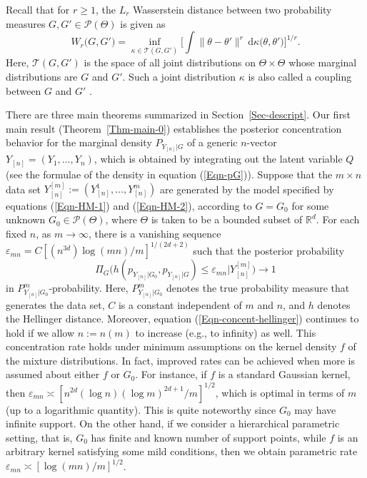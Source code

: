 \documentclass[MSNbibl,number,citesort]{arxbj}
\newcommand{\eqref}[1]{(\ref{#1})}
\newcommand{\real}{\mathbb{R}}
\newcommand{\Pcal}{\mathscr{P}}
\newcommand{\TPlan}{\mathcal{T}}
\newcommand{\Wr}{W_r}
\newcommand{\coupling}{\kappa}
\newcommand{\PGz}{P_{Y_{[n]}|G_0}}
\newcommand{\PG}{P_{Y_{[n]}|G}}
\newcommand{\YYn}{Y_{[n]}}
\newcommand{\epsmn}{\varepsilon_{mn}}
\begin{document}
Recall that for $r\geq1$, the $L_r$ Wasserstein distance between
two probability measures $G,G'\in\Pcal(\Theta)$ is given as
%
%
\begin{equation}
\label{Eqn-W-def} \Wr \bigl(G,G' \bigr) = \inf_{\coupling\in\TPlan(G,G')}
\biggl[\int\bigl\|\theta- \theta'\bigr\|^r \,\mathrm{d}\coupling
\bigl(\theta, \theta' \bigr) \biggr]^{1/r}.
\end{equation}
%
Here, $\TPlan(G,G')$ is the space of all joint distributions
on $\Theta\times\Theta$ whose marginal distributions are $G$ and $G'$.
Such a joint distribution $\coupling$ is also called a coupling
between $G$ and $G'$ \cite{Villani-08}.

There are three main theorems summarized in Section~\ref{Sec-descript}.
Our first main result (Theorem~\ref{Thm-main-0}) establishes the
posterior concentration behavior for the marginal density
$\PG$ of a generic $n$-vector $\YYn= (Y_1,\ldots,Y_n)$, which is obtained
by integrating out the latent variable $Q$ (see the formulae
of the density in equation \eqref{Eqn-pG}).
Suppose that the $m\times n$ data set $\YYn^{[m]} :=
(\YYn^1,\ldots,\YYn^m)$ are generated by the model specified
by equations \eqref{Eqn-HM-1} and \eqref{Eqn-HM-2},
according to $G= G_0$ for some unknown $G_0 \in\Pcal(\Theta)$,
where $\Theta$ is taken to be a bounded subset of $\real^d$.
For each fixed $n$, as $m\rightarrow\infty$, there is a vanishing
sequence $\epsmn= C[(n^{3d})\log(mn)/m]^{1/(2d+2)}$ such
that the posterior probability
%
%
\begin{equation}
\label{Eqn-concent-hellinger} \Pi_G \bigl(h(p_{Y_{[n]}|G_0},
{p_{Y_{[n]}|G}}) \leq\epsmn| \YYn^{[m]} \bigr)
\longrightarrow1
\end{equation}
%
in $\PGz^m$-probability. Here, $\PGz^m$ denotes the true probability
measure that generates the data set, $C$ is a constant independent of
$m$ and $n$, and $h$ denotes the Hellinger distance. Moreover,
equation \eqref{Eqn-concent-hellinger} continues to hold if we allow
$n:= n(m)$ to increase
(e.g., to infinity) as well. This concentration rate holds under minimum
assumptions on the kernel density $f$ of the mixture distributions.
In fact, improved rates can be achieved when more is assumed about
either $f$ or $G_0$. For instance, if $f$ is a standard Gaussian
kernel, then
$\epsmn\asymp
[n^{2d}(\log n)(\log m)^{2d+1}/m]^{1/2}$, which is optimal in terms
of $m$ (up to a logarithmic quantity). This is quite noteworthy since
$G_0$ may have infinite support. On the other hand, if we consider
a hierarchical parametric setting, that is,
$G_0$ has finite and known number of support points, while $f$ is
an arbitrary kernel satisfying some mild conditions, then
we obtain parametric rate $\epsmn\asymp[\log(mn)/m]^{1/2}$.
\end{document}

